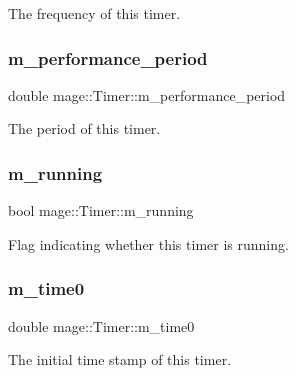 The frequency of this timer. \hypertarget{classmage_1_1_timer_a5831e973d64389b1d98fbb6c51de6436}{}\label{classmage_1_1_timer_a5831e973d64389b1d98fbb6c51de6436} 
\subsubsection{\texorpdfstring{m\+\_\+performance\+\_\+period}{m\_performance\_period}}
{\footnotesize\ttfamily double mage\+::\+Timer\+::m\+\_\+performance\+\_\+period\hspace{0.3cm}{\ttfamily [private]}}

The period of this timer. \hypertarget{classmage_1_1_timer_ac8d975843e5b2199848284de910d3291}{}\label{classmage_1_1_timer_ac8d975843e5b2199848284de910d3291} 
\subsubsection{\texorpdfstring{m\+\_\+running}{m\_running}}
{\footnotesize\ttfamily bool mage\+::\+Timer\+::m\+\_\+running\hspace{0.3cm}{\ttfamily [private]}}

Flag indicating whether this timer is running. \hypertarget{classmage_1_1_timer_a73fa08d14bfa273f158f967a8e58f96f}{}\label{classmage_1_1_timer_a73fa08d14bfa273f158f967a8e58f96f} 
\subsubsection{\texorpdfstring{m\+\_\+time0}{m\_time0}}
{\footnotesize\ttfamily double mage\+::\+Timer\+::m\+\_\+time0\hspace{0.3cm}{\ttfamily [private]}}

The initial time stamp of this timer. 